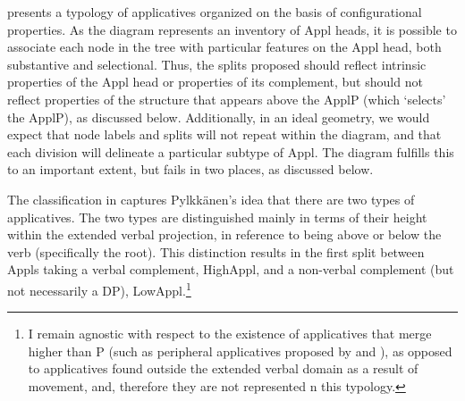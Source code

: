 \documentclass[output=paper,colorlinks,citecolor=brown,nonflat]{./langscibook}
\begin{document}
\addtocounter{footnote}{-1}
\addtocounter{footnote}{1}


 presents a typology of applicatives organized on the basis of configurational properties. As the diagram represents an inventory of Appl heads, it is possible to associate each node in the tree with particular features on the Appl head, both substantive and selectional. Thus, the splits proposed should reflect intrinsic properties of the Appl head or properties of its complement, but should not reflect properties of the structure that appears above the ApplP (which ‘selects’ the ApplP), as discussed below. Additionally, in an ideal geometry, we would expect that node labels and splits will not repeat within the diagram, and that each division will delineate a particular subtype of Appl. The diagram fulfills this to an important extent, but fails in two places, as discussed below.

The classification in  captures Pylkkänen’s idea that there are two types of applicatives. The two types are distinguished mainly in terms of their height within the extended verbal projection, in reference to being above or below the verb (specifically the root). This distinction results in the first split between Appls taking a verbal complement, HighAppl, and a non-verbal complement (but not necessarily a DP), LowAppl.\footnote{I remain agnostic with respect to the existence of applicatives that merge higher than \liv P (such as peripheral applicatives proposed by \citealt{Kim2011high} and \citealt{Tsai2018}), as opposed to applicatives found outside the extended verbal domain as a result of movement, and, therefore they are not represented n this typology.}
\end{document}
